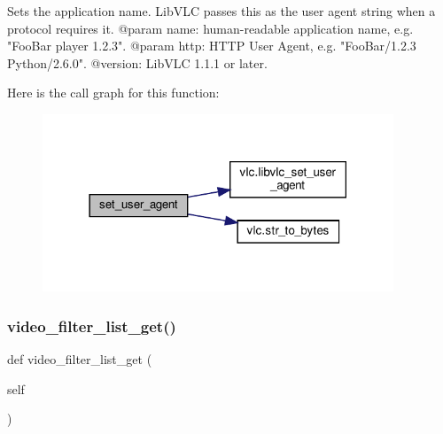 \begin{DoxyVerb}Sets the application name. LibVLC passes this as the user agent string
when a protocol requires it.
@param name: human-readable application name, e.g. "FooBar player 1.2.3".
@param http: HTTP User Agent, e.g. "FooBar/1.2.3 Python/2.6.0".
@version: LibVLC 1.1.1 or later.
\end{DoxyVerb}
 Here is the call graph for this function\+:
\nopagebreak
\begin{figure}[H]
\begin{center}
\leavevmode
\includegraphics[width=297pt]{classvlc_1_1_instance_a363684325b3a6baa1168f7f89f4b9bb4_cgraph}
\end{center}
\end{figure}
\mbox{\label{classvlc_1_1_instance_a72cb3f80f491fa38104614e5966cc396}} 
\subsubsection{\texorpdfstring{video\+\_\+filter\+\_\+list\+\_\+get()}{video\_filter\_list\_get()}}
{\footnotesize\ttfamily def video\+\_\+filter\+\_\+list\+\_\+get (\begin{DoxyParamCaption}\item[{}]{self }\end{DoxyParamCaption})}

